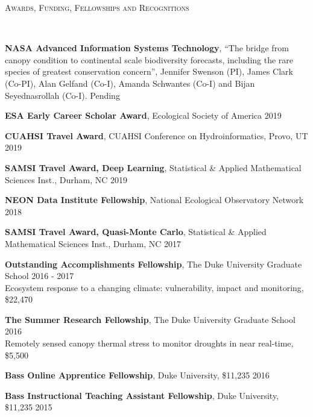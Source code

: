 \documentclass[10pt]{article}
\newenvironment{changemargin}[2]{%
  \begin{list}{}{%
 \setlength{\topsep}{0pt}%
 \setlength{\leftmargin}{#1}%
 \setlength{\rightmargin}{#2}%
 \setlength{\listparindent}{\parindent}%
 \setlength{\itemindent}{\parindent}%
 \setlength{\parsep}{\parskip}%
  }%
  \item[]}{\end{list}
}
\newcommand{\lineover}{
  \begin{changemargin}{-0.05in}{-0.05in}
  \vspace*{-8pt}
  \hrulefill \\
  \vspace*{-2pt}
  \end{changemargin}
}
\newcommand{\header}[1]{
  \begin{changemargin}{-0.5in}{-0.5in}
  \scshape{#1}\\
  \lineover
  \end{changemargin}
}
\newenvironment{body} {
  \vspace*{-2pt}
  \begin{changemargin}{-0.5in}{-0.5in}
}
{\end{changemargin}
}
\begin{document}
\header{Awards, Funding, Fellowships and Recognitions}

\begin{body}
 \textbf{NASA Advanced Information Systems Technology}, ``The bridge from canopy condition to continental scale biodiversity forecasts, including the rare species of greatest conservation concern'', Jennifer Swenson (PI), James Clark (Co-PI), Alan Gelfand (Co-I), Amanda Schwantes (Co-I) and Bijan Seyednasrollah (Co-I). \hfill{Pending}\\
  \medskip
  
  \textbf{ESA Early Career Scholar Award}, Ecological Society of America \hfill {2019}\\
  \medskip

  \textbf{CUAHSI Travel Award}, CUAHSI Conference on Hydroinformatics, Provo, UT \hfill {2019}\\
  \medskip


  \textbf{SAMSI Travel Award, Deep Learning}, Statistical \& Applied Mathematical Sciences Inst., Durham, NC \hfill {2019}\\
  \medskip

  \textbf{NEON Data Institute Fellowship}, National Ecological Observatory Network  \hfill {2018}\\
  \medskip

  \textbf{SAMSI Travel Award, Quasi-Monte Carlo}, Statistical \& Applied Mathematical Sciences Inst., Durham, NC \hfill {2017}\\
  \medskip

  \textbf{Outstanding Accomplishments Fellowship}, The Duke University Graduate School \hfill {2016 - 2017}\\
  Ecosystem response to a changing climate: vulnerability, impact and monitoring, \$22,470 \\
  \medskip

  \textbf{The Summer Research Fellowship}, The Duke University Graduate School \hfill {2016}\\
  Remotely sensed canopy thermal stress to monitor droughts in near real-time, \$5,500 \\
  \medskip

  \textbf{Bass Online Apprentice Fellowship}, Duke University, \$11,235 \hfill {2016}\\
  \medskip

  \textbf{Bass Instructional Teaching Assistant Fellowship}, Duke University, \$11,235 \hfill {2015}\\
  \medskip


\end{body}
\end{document}
